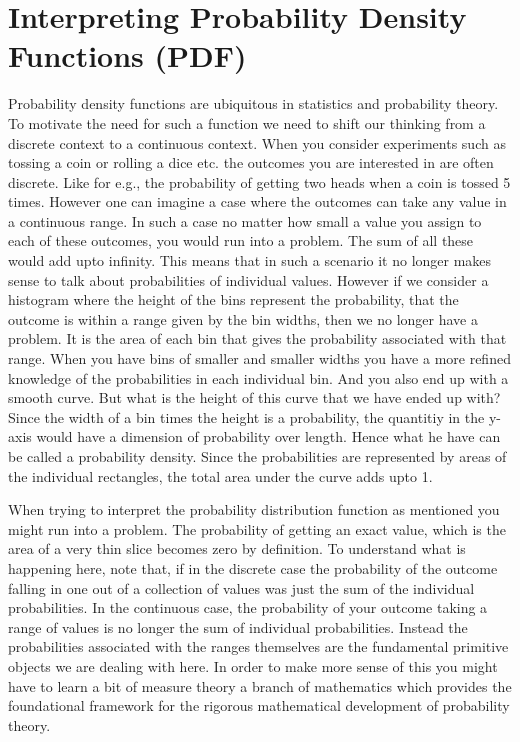 \documentclass{../template/texnote}
\begin{document}
\section{Interpreting Probability Density Functions (PDF)}
Probability density functions are ubiquitous in statistics and probability theory. To motivate the need for such a function we need to shift our thinking from a discrete context to a continuous context.
When you consider experiments such as tossing a coin or rolling a dice etc. the outcomes you are interested in are often discrete.
Like for e.g., the probability of getting two heads when a coin is tossed 5 times.
However one can imagine a case where the outcomes can take any value in a continuous range.
In such a case no matter how small a value you assign to each of these outcomes, you would run into a problem. The sum of all these would add upto infinity.
This means that in such a scenario it no longer makes sense to talk about probabilities of individual values.
However if we consider a histogram where the height of the bins represent the probability, that the outcome is within a range given by the bin widths, then we no longer have a problem.
It is the area of each bin that gives the probability associated with that range.
When you have bins of smaller and smaller widths you have a more refined knowledge of the probabilities in each individual bin.
And you also end up with a smooth curve.
But what is the height of this curve that we have ended up with?
Since the width of a bin times the height is a probability, the quantitiy in the y-axis would have a dimension of probability over length.
Hence what he have can be called a probability density.
Since the probabilities are represented by areas of the individual rectangles, the total area under the curve adds upto 1. 

When trying to interpret the probability distribution function as mentioned you might run into a problem.
The probability of getting an exact value, which is the area of a very thin slice becomes zero by definition.
To understand what is happening here, note that, if in the discrete case the probability of the outcome falling in one out of a collection of values was just the sum of the individual probabilities. 
In the continuous case, the probability of your outcome taking a range of values is no longer the sum of individual probabilities.
Instead the probabilities associated with the ranges themselves are the fundamental primitive objects we are dealing with here.
In order to make more sense of this you might have to learn a bit of measure theory a branch of mathematics which provides the foundational framework for the rigorous mathematical development of probability theory.
\end{document}
